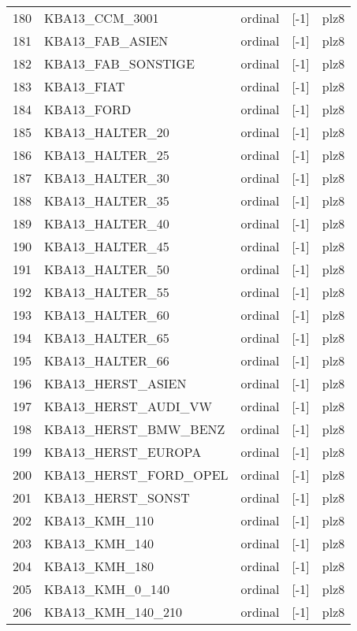 \begin{longtable}{lllll}
180 &   KBA13\_CCM\_3001 &  ordinal &   [-1] &  plz8 \\
181 &  KBA13\_FAB\_ASIEN &  ordinal &   [-1] &  plz8 \\
182 &   KBA13\_FAB\_SONSTIGE &  ordinal &   [-1] &  plz8 \\
183 &   KBA13\_FIAT &  ordinal &   [-1] &  plz8 \\
184 &   KBA13\_FORD &  ordinal &   [-1] &  plz8 \\
185 &  KBA13\_HALTER\_20 &  ordinal &   [-1] &  plz8 \\
186 &  KBA13\_HALTER\_25 &  ordinal &   [-1] &  plz8 \\
187 &  KBA13\_HALTER\_30 &  ordinal &   [-1] &  plz8 \\
188 &  KBA13\_HALTER\_35 &  ordinal &   [-1] &  plz8 \\
189 &  KBA13\_HALTER\_40 &  ordinal &   [-1] &  plz8 \\
190 &  KBA13\_HALTER\_45 &  ordinal &   [-1] &  plz8 \\
191 &  KBA13\_HALTER\_50 &  ordinal &   [-1] &  plz8 \\
192 &  KBA13\_HALTER\_55 &  ordinal &   [-1] &  plz8 \\
193 &  KBA13\_HALTER\_60 &  ordinal &   [-1] &  plz8 \\
194 &  KBA13\_HALTER\_65 &  ordinal &   [-1] &  plz8 \\
195 &  KBA13\_HALTER\_66 &  ordinal &   [-1] &  plz8 \\
196 &    KBA13\_HERST\_ASIEN &  ordinal &   [-1] &  plz8 \\
197 &  KBA13\_HERST\_AUDI\_VW &  ordinal &   [-1] &  plz8 \\
198 & KBA13\_HERST\_BMW\_BENZ &  ordinal &   [-1] &  plz8 \\
199 &   KBA13\_HERST\_EUROPA &  ordinal &   [-1] &  plz8 \\
200 &    KBA13\_HERST\_FORD\_OPEL &  ordinal &   [-1] &  plz8 \\
201 &    KBA13\_HERST\_SONST &  ordinal &   [-1] &  plz8 \\
202 &    KBA13\_KMH\_110 &  ordinal &   [-1] &  plz8 \\
203 &    KBA13\_KMH\_140 &  ordinal &   [-1] &  plz8 \\
204 &    KBA13\_KMH\_180 &  ordinal &   [-1] &  plz8 \\
205 &  KBA13\_KMH\_0\_140 &  ordinal &   [-1] &  plz8 \\
206 &    KBA13\_KMH\_140\_210 &  ordinal &   [-1] &  plz8 \\

\end{longtable}
